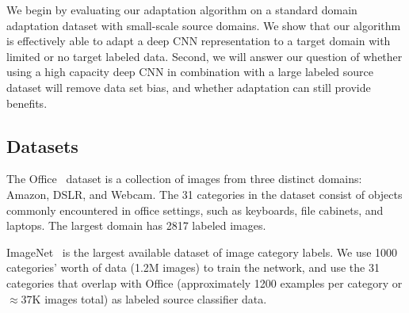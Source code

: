 \label{sec:eval}

We begin by evaluating our adaptation algorithm on a standard domain adaptation dataset with small-scale source domains.
We show that our algorithm is effectively able to adapt a deep CNN representation to a target domain with limited or no
target labeled data.
Second, we will answer our question of whether using a high capacity deep CNN in combination with a large labeled source dataset will remove data set 
bias, and whether adaptation can still provide benefits.



\subsection{Datasets}
The Office~\cite{saenko-eccv10} dataset is a collection of images from three
distinct domains: Amazon, DSLR, and Webcam. The 31 categories in the dataset
consist of objects commonly encountered in office settings, such as keyboards,
file cabinets, and laptops. The largest domain has 2817 labeled images.

ImageNet~\cite{ilsvrc2012} is the largest available dataset of image category labels. We use 1000 categories' worth of data (1.2M images) to train the network, and use the 31 categories that overlap with Office (approximately 1200 examples per category or  $\approx$37K images total) as labeled source classifier data.

